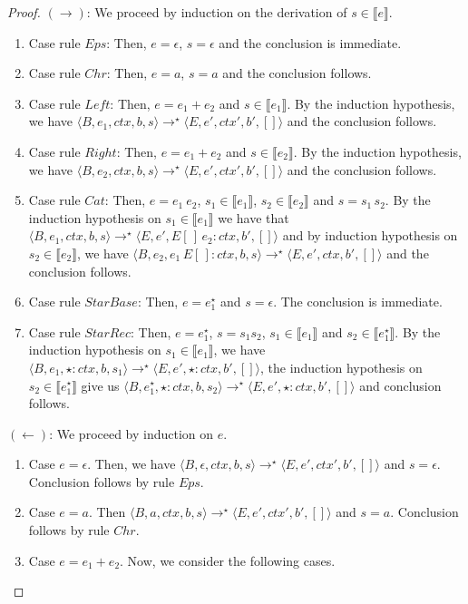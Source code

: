 \documentclass[oneside,12pt]{scrbook}
\theoremstyle{definition}
\newcommand{\sembrackets}[1]{\ensuremath{\llbracket #1 \rrbracket}}
\newcommand{\conf}[1]{\ensuremath{\langle #1 \rangle}}
\theoremstyle{plain}
\theoremstyle{definition}
\begin{document}
\begin{proof}
	$(\to)$: We proceed by induction on the derivation of $s\in\sembrackets{e}$.
	\begin{enumerate}
		\item Case rule $Eps$: Then, $e = \epsilon$, $s = \epsilon$ and the conclusion is immediate.
		\item Case rule $Chr$: Then, $e = a$, $s = a$ and the conclusion follows.
		\item Case rule $Left$: Then, $e = e_1 + e_2$ and $s \in\sembrackets{e_1}$. By the induction hypothesis,
		we have $\conf{B,e_1,ctx,b,s}\to^\star\conf{E,e',ctx',b',[]}$ and the conclusion follows.
		\item Case rule $Right$: Then, $e = e_1 + e_2$ and $s \in\sembrackets{e_2}$. By the induction hypothesis,
		we have $\conf{B,e_2,ctx,b,s}\to^\star\conf{E,e',ctx',b',[]}$ and the conclusion follows.
		\item Case rule $Cat$: Then, $e = e_1\:e_2$, $s_1 \in\sembrackets{e_1}$, $s_2\in\sembrackets{e_2}$ and
		$s = s_1\,s_2$. By the induction hypothesis on $s_1 \in\sembrackets{e_1}$ we have that
		$\conf{B,e_1,ctx,b,s}\to^\star\conf{E,e',E[\,]\,e_2 : ctx,b',[]}$ and by
		induction hypothesis on $s_2\in\sembrackets{e_2}$, we have
		$\conf{B,e_2,e_1\,E[\,]:ctx,b,s}\to^\star\conf{E,e',ctx,b',[]}$ and the conclusion follows.
		\item Case rule $StarBase$: Then, $e = e_1^\star$ and $s = \epsilon$. The conclusion is immediate.
		\item Case rule $StarRec$: Then, $e = e_1^\star$, $s = s_1s_2$, $s_1 \in \sembrackets{e_1}$ and
		$s_2\in\sembrackets{e_1^\star}$. By the induction hypothesis on  $s_1 \in \sembrackets{e_1}$, we
		have $\conf{B,e_1,\star : ctx,b,s_1}\to^\star\conf{E,e', \star: ctx,b',[]}$, the induction
		hypothesis on $s_2\in\sembrackets{e_1^\star}$ give us $\conf{B,e_1^\star,\star : ctx,b,s_2}\to^\star\conf{E,e', \star: ctx,b',[]}$
		and conclusion follows.
	\end{enumerate}
	$(\leftarrow)$: We proceed by induction on $e$.
	\begin{enumerate}
		\item Case $e = \epsilon$. Then, we have
		$\conf{B,\epsilon,ctx,b,s}\to^\star\conf{E,e',ctx',b',[]}$ and $s = \epsilon$. Conclusion follows by rule $Eps$.
		\item Case $e = a$. Then
		$\conf{B,a,ctx,b,s}\to^\star\conf{E,e',ctx',b',[]}$ and $s = a$. Conclusion follows by rule $Chr$.
		\item Case $e = e_1 + e_2$. Now, we consider the following cases.

\end{enumerate}
\end{proof}
\end{document}
